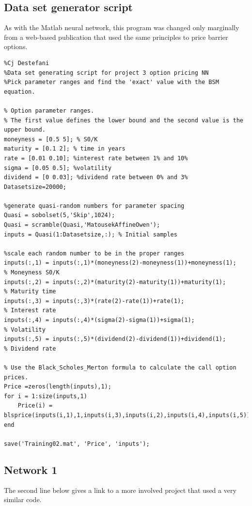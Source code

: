 \documentclass[reqno,14pt]{amsart}
\theoremstyle{plain}
\theoremstyle{definition}
\theoremstyle{remark}
\begin{document}
\subsection{Data set generator script} As with the Matlab neural network, this program was changed only marginally from a web-based publication that used the same principles to price barrier options.
\begin{lstlisting}
%Cj Destefani
%Data set generating script for project 3 option pricing NN
%Pick parameter ranges and find the 'exact' value with the BSM equation.

% Option parameter ranges.
% The first value defines the lower bound and the second value is the upper bound.
moneyness = [0.5 5]; % S0/K
maturity = [0.1 2]; % time in years
rate = [0.01 0.10]; %interest rate between 1% and 10%
sigma = [0.05 0.5]; %volatility
dividend = [0 0.03]; %dividend rate between 0% and 3%
Datasetsize=20000;

%generate quasi-random numbers for parameter spacing
Quasi = sobolset(5,'Skip',1024);
Quasi = scramble(Quasi,'MatousekAffineOwen');
inputs = Quasi(1:Datasetsize,:); % Initial samples

%scale each random number to be in the proper ranges
inputs(:,1) = inputs(:,1)*(moneyness(2)-moneyness(1))+moneyness(1);   % Moneyness S0/K
inputs(:,2) = inputs(:,2)*(maturity(2)-maturity(1))+maturity(1);      % Maturity time
inputs(:,3) = inputs(:,3)*(rate(2)-rate(1))+rate(1);                  % Interest rate
inputs(:,4) = inputs(:,4)*(sigma(2)-sigma(1))+sigma(1);               % Volatility 
inputs(:,5) = inputs(:,5)*(dividend(2)-dividend(1))+dividend(1);      % Dividend rate
 
% Use the Black_Scholes_Merton formula to calculate the call option prices.
Price =zeros(length(inputs),1);
for i = 1:size(inputs,1)
    Price(i) = blsprice(inputs(i,1),1,inputs(i,3),inputs(i,2),inputs(i,4),inputs(i,5));
end

save('Training02.mat', 'Price', 'inputs');  
\end{lstlisting}

\subsection{Network 1} The second line below gives a link to a more involved project that used a very similar code.\\
\end{document}
